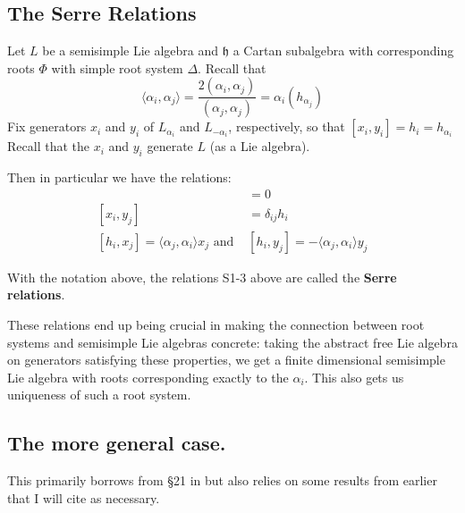 \documentclass[12pt]{article}
\theoremstyle{nonumberbreak}
\theoremstyle{changebreak}
\theoremstyle{nonumberplain}
\theoremstyle{change}
\newcommand*{\h}{\mathfrak{h}}
\begin{document}
\subsection{The Serre Relations}
Let $L$ be a semisimple Lie algebra and $\h$ a Cartan subalgebra with corresponding roots $\Phi$ with simple root system $\Delta$.
Recall that 
\[\langle\alpha_i,\alpha_j\rangle=\frac{2(\alpha_i,\alpha_j)}{(\alpha_j,\alpha_j)}=\alpha_i(h_{\alpha_j})\]
Fix generators $x_i$ and $y_i$ of $L_{\alpha_i}$ and $L_{-\alpha_i}$, respectively, so that $[x_i,y_i]=h_i=h_{\alpha_i}$
Recall that the $x_i$ and $y_i$ generate $L$ (as a Lie algebra).

Then in particular we have the relations:
\begin{align*}
	[h_i,h_j]&=0\tag{S1}\\
	[x_i,y_j]&=\delta_{ij}h_i\tag{S2}\\
	[h_i,x_j]=\langle\alpha_j,\alpha_i\rangle x_j\text{ and }& [h_i,y_j]=-\langle\alpha_j,\alpha_i\rangle y_j\tag{S3}
\end{align*}
\begin{defn}
	With the notation above, the relations S1-3 above are called the \textbf{Serre relations}.
\end{defn}	

These relations end up being crucial in making the connection between root systems and semisimple Lie algebras concrete:
taking the abstract free Lie algebra on generators satisfying these properties, we get a finite dimensional semisimple Lie algebra
with roots corresponding exactly to the $\alpha_i$. This also gets us uniqueness of such a root system.

\subsection{The more general case.}
This primarily borrows from \S 21 in \cite{humphreys1} but also relies on some results from earlier that I will cite as 
necessary. 
\end{document}

